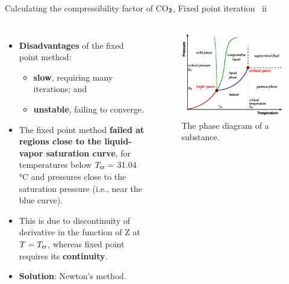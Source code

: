 \begin{frame}[fragile]{Calculating the compressibility factor of CO$_{\boldsymbol{\sf 2}}$, Fixed point iteration \, ii}
\begin{columns}[t]

\begin{itemize}
\item \textbf{Disadvantages} of the fixed point method:\\[-2pt]
\begin{itemize}
\item \textbf{slow}, requiring many iterations; and 
\item \textbf{unstable}, failing to converge. 
\end{itemize}
\pause
\item The fixed point method \textbf{failed at regions close
to the liquid-vapor saturation curve}, for temperatures below
$T_{\sf cr} = $  31.04 °C and pressures close to the saturation pressure (i.e., near the blue curve).
\pause
\item This is due to discontinuity of derivative in the function of Z at $T = T_{\sf cr}$, 
whereas fixed point requires its \alert{\textbf{continuity}}.
\pause
\item \textbf{Solution}: Newton's method.
\end{itemize}


\begin{figure}
\begin{centering}
\includegraphics[width=1\columnwidth]{figures/activity-models/phase-diagram-pt}
\par\end{centering}
\caption{The phase diagram of a substance.}
\end{figure}

\end{columns}

\end{frame}
